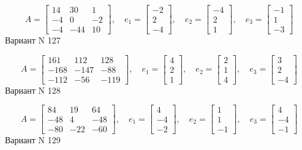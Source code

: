 \documentclass[11pt]{report}
\begin{document}
$$A = \left[\begin{matrix}14 & 30 & 1\\-4 & 0 & -2\\-4 & -44 & 10\end{matrix}\right],\quad e_1 = \left[\begin{matrix}-2\\2\\-4\end{matrix}\right],\quad e_2 = \left[\begin{matrix}-4\\2\\1\end{matrix}\right],\quad e_3 = \left[\begin{matrix}-1\\1\\-3\end{matrix}\right]$$Вариант N 127

$$A = \left[\begin{matrix}161 & 112 & 128\\-168 & -147 & -88\\-112 & -56 & -119\end{matrix}\right],\quad e_1 = \left[\begin{matrix}4\\2\\1\end{matrix}\right],\quad e_2 = \left[\begin{matrix}2\\1\\4\end{matrix}\right],\quad e_3 = \left[\begin{matrix}3\\2\\-4\end{matrix}\right]$$Вариант N 128

$$A = \left[\begin{matrix}84 & 19 & 64\\-48 & 4 & -48\\-80 & -22 & -60\end{matrix}\right],\quad e_1 = \left[\begin{matrix}4\\-4\\-2\end{matrix}\right],\quad e_2 = \left[\begin{matrix}1\\1\\-1\end{matrix}\right],\quad e_3 = \left[\begin{matrix}4\\-4\\-1\end{matrix}\right]$$Вариант N 129
\end{document}
